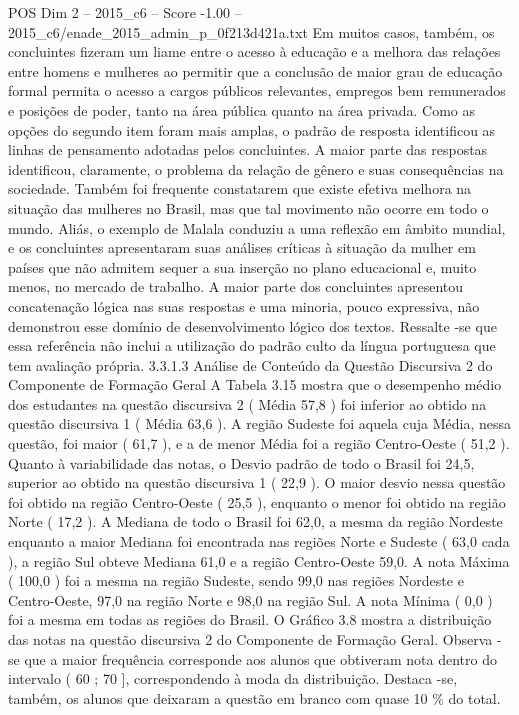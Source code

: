 \begin{textsample}{POS Dim 2 – 2015\_c6 – Score -1.00 – 2015\_c6/enade\_2015\_admin\_p\_0f213d421a.txt}
Em muitos casos, também, os concluintes fizeram um liame entre o acesso à educação e a melhora das relações entre homens e mulheres ao permitir que a conclusão de maior grau de educação formal permita o acesso a cargos públicos relevantes, empregos bem remunerados e posições de poder, tanto na área pública quanto na área privada.
Como as opções do segundo item foram mais amplas, o padrão de resposta identificou as linhas de pensamento adotadas pelos concluintes.
A maior parte das respostas identificou, claramente, o problema da relação de gênero e suas consequências na sociedade.
Também foi frequente constatarem que existe efetiva melhora na situação das mulheres no Brasil, mas que tal movimento não ocorre em todo o mundo.
Aliás, o exemplo de Malala conduziu a uma reflexão em âmbito mundial, e os concluintes apresentaram suas análises críticas à situação da mulher em países que não admitem sequer a sua inserção no plano educacional e, muito menos, no mercado de trabalho.
A maior parte dos concluintes apresentou concatenação lógica nas suas respostas e uma minoria, pouco expressiva, não demonstrou esse domínio de desenvolvimento lógico dos textos.
Ressalte -se que essa referência não inclui a utilização do padrão culto da língua portuguesa que tem avaliação própria. 3.3.1.3 Análise de Conteúdo da Questão Discursiva 2 do Componente de Formação Geral A Tabela 3.15 mostra que o desempenho médio dos estudantes na questão discursiva 2 ( Média 57,8 ) foi inferior ao obtido na questão discursiva 1 ( Média 63,6 ).
A região Sudeste foi aquela cuja Média, nessa questão, foi maior ( 61,7 ), e a de menor Média foi a região Centro-Oeste ( 51,2 ).
Quanto à variabilidade das notas, o Desvio padrão de todo o Brasil foi 24,5, superior ao obtido na questão discursiva 1 ( 22,9 ).
O maior desvio nessa questão foi obtido na região Centro-Oeste ( 25,5 ), enquanto o menor foi obtido na região Norte ( 17,2 ).
A Mediana de todo o Brasil foi 62,0, a mesma da região Nordeste enquanto a maior Mediana foi encontrada nas regiões Norte e Sudeste ( 63,0 cada ), a região Sul obteve Mediana 61,0 e a região Centro-Oeste 59,0.
A nota Máxima ( 100,0 ) foi a mesma na região Sudeste, sendo 99,0 nas regiões Nordeste e Centro-Oeste, 97,0 na região Norte e 98,0 na região Sul.
A nota Mínima ( 0,0 ) foi a mesma em todas as regiões do Brasil.
O Gráfico 3.8 mostra a distribuição das notas na questão discursiva 2 do Componente de Formação Geral.
Observa -se que a maior frequência corresponde aos alunos que obtiveram nota dentro do intervalo ( 60 ; 70 ], correspondendo à moda da distribuição.
Destaca -se, também, os alunos que deixaram a questão em branco com quase 10 \% do total.

\end{textsample}
